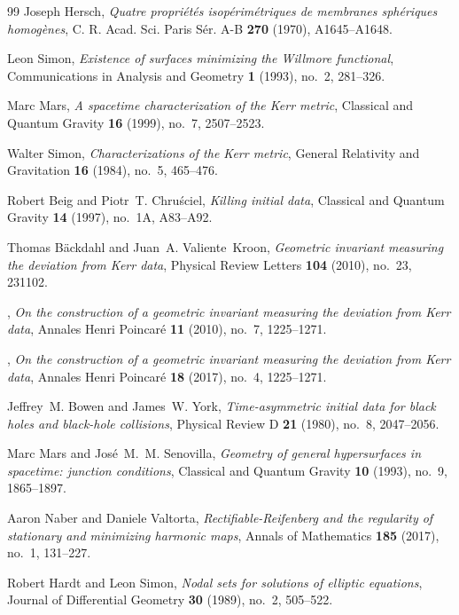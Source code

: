 \documentclass[12pt]{article}
\theoremstyle{plain}
\theoremstyle{definition}
\theoremstyle{remark}
\begin{document}
\begin{thebibliography}{99}
Joseph Hersch, \emph{Quatre propri\'et\'es i\-so\-p\'e\-ri\-m\'e\-tri\-ques de mem\-branes sph\'e\-riques ho\-mo\-g\`enes}, C. R. Acad. Sci. Paris S\'er. A-B \textbf{270} (1970), A1645--A1648.

Leon Simon, \emph{Existence of surfaces minimizing the {W}illmore functional}, Communications in Analysis and Geometry \textbf{1} (1993), no.~2, 281--326.

Marc Mars, \emph{A spacetime characterization of the Kerr metric}, Classical and Quantum Gravity \textbf{16} (1999), no.~7, 2507--2523.

Walter Simon, \emph{Characterizations of the Kerr metric}, General Relativity and Gravitation \textbf{16} (1984), no.~5, 465--476.

Robert Beig and Piotr~T. Chru\'sciel, \emph{Killing initial data}, Classical and Quantum Gravity \textbf{14} (1997), no.~1A, A83--A92.

Thomas B\"ackdahl and Juan~A. Valiente~Kroon, \emph{Geometric invariant measuring the deviation from Kerr data}, Physical Review Letters \textbf{104} (2010), no.~23, 231102.

\bysame, \emph{On the construction of a geometric invariant measuring the deviation from Kerr data}, Annales Henri Poincar\'e \textbf{11} (2010), no.~7, 1225--1271.

\bysame, \emph{On the construction of a geometric invariant measuring the deviation from Kerr data}, Annales Henri Poincar\'e \textbf{18} (2017), no.~4, 1225--1271.

Jeffrey~M. Bowen and James~W. York, \emph{Time-asymmetric initial data for black holes and black-hole collisions}, Physical Review D \textbf{21} (1980), no.~8, 2047--2056.

Marc Mars and Jos\'e~M.~M. Senovilla, \emph{Geometry of general hypersurfaces in spacetime: junction conditions}, Classical and Quantum Gravity \textbf{10} (1993), no.~9, 1865--1897.

Aaron Naber and Daniele Valtorta, \emph{Rectifiable-Reifenberg and the regularity of stationary and minimizing harmonic maps}, Annals of Mathematics \textbf{185} (2017), no.~1, 131--227.

Robert Hardt and Leon Simon, \emph{Nodal sets for solutions of elliptic equations}, Journal of Differential Geometry \textbf{30} (1989), no.~2, 505--522.


\end{thebibliography}
\end{document}
